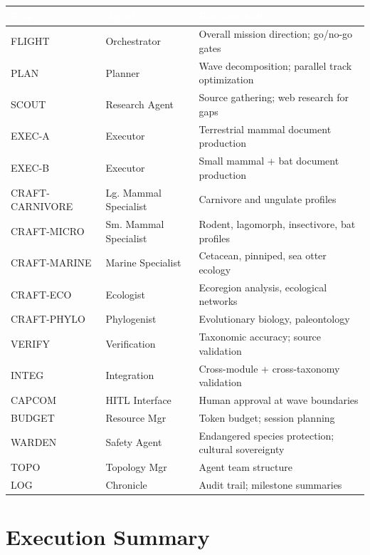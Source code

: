 \documentclass[11pt,letterpaper]{article}
\newcommand{\tableheader}[1]{\textbf{\sffamily\textcolor{white}{#1}}}
\begin{document}
\begin{center}
\begin{tabularx}{\textwidth}{L{2cm}L{2.5cm}X}
\toprule
{}
\tableheader{Role} & \tableheader{Agent} & \tableheader{Responsibility} \\
\midrule
FLIGHT & Orchestrator & Overall mission direction; go/no-go gates \\
PLAN & Planner & Wave decomposition; parallel track optimization \\
SCOUT & Research Agent & Source gathering; web research for gaps \\
EXEC-A & Executor & Terrestrial mammal document production \\
EXEC-B & Executor & Small mammal + bat document production \\
CRAFT-CARNIVORE & Lg. Mammal Specialist & Carnivore and ungulate profiles \\
CRAFT-MICRO & Sm. Mammal Specialist & Rodent, lagomorph, insectivore, bat profiles \\
CRAFT-MARINE & Marine Specialist & Cetacean, pinniped, sea otter ecology \\
CRAFT-ECO & Ecologist & Ecoregion analysis, ecological networks \\
CRAFT-PHYLO & Phylogenist & Evolutionary biology, paleontology \\
VERIFY & Verification & Taxonomic accuracy; source validation \\
INTEG & Integration & Cross-module + cross-taxonomy validation \\
CAPCOM & HITL Interface & Human approval at wave boundaries \\
BUDGET & Resource Mgr & Token budget; session planning \\
WARDEN & Safety Agent & Endangered species protection; cultural sovereignty \\
TOPO & Topology Mgr & Agent team structure \\
LOG & Chronicle & Audit trail; milestone summaries \\
\bottomrule
\end{tabularx}
\end{center}

\section{Execution Summary}
\end{document}
